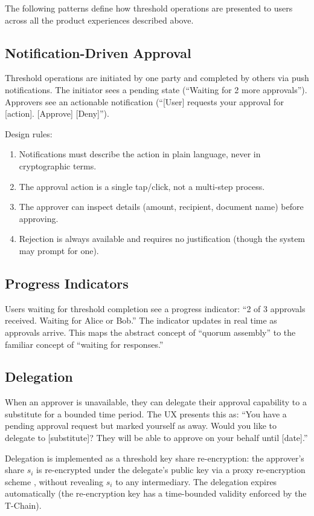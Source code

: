 \documentclass[11pt,a4paper]{article}
\begin{document}
The following patterns define how threshold operations are presented to
users across all the product experiences described above.

\subsection{Notification-Driven Approval}

Threshold operations are initiated by one party and completed by others
via push notifications. The initiator sees a pending state (``Waiting for
2 more approvals''). Approvers see an actionable notification (``[User]
requests your approval for [action]. [Approve] [Deny]'').

Design rules:
\begin{enumerate}
    \item Notifications must describe the action in plain language, never
    in cryptographic terms.
    \item The approval action is a single tap/click, not a multi-step process.
    \item The approver can inspect details (amount, recipient, document name)
    before approving.
    \item Rejection is always available and requires no justification (though
    the system may prompt for one).
\end{enumerate}

\subsection{Progress Indicators}

Users waiting for threshold completion see a progress indicator:
``2 of 3 approvals received. Waiting for Alice or Bob.'' The indicator
updates in real time as approvals arrive. This maps the abstract concept
of ``quorum assembly'' to the familiar concept of ``waiting for responses.''

\subsection{Delegation}

When an approver is unavailable, they can delegate their approval
capability to a substitute for a bounded time period. The UX presents
this as: ``You have a pending approval request but marked yourself as
away. Would you like to delegate to [substitute]? They will be able to
approve on your behalf until [date].''

Delegation is implemented as a threshold key share re-encryption: the
approver's share $s_i$ is re-encrypted under the delegate's public key
via a proxy re-encryption scheme \cite{blaze1998divertible}, without
revealing $s_i$ to any intermediary. The delegation expires automatically
(the re-encryption key has a time-bounded validity enforced by the
T-Chain).
\end{document}
